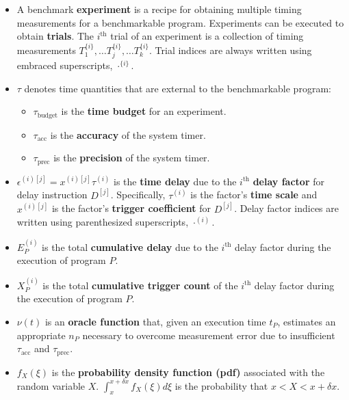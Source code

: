 \documentclass[conference]{IEEEtran}
\begin{document}
\begin{itemize}
    \item
    A benchmark \textbf{experiment} is a recipe for obtaining multiple timing measurements
    for a benchmarkable program. Experiments can be executed to obtain \textbf{trials}. The
    $i^{\textrm{th}}$ trial of an experiment is a collection of timing measurements
    $T^{\{i\}}_1, \dots T^{\{i\}}_j, \dots T^{\{i\}}_k$. Trial indices are always
    written using embraced superscripts, $\cdot^{\{i\}}$.

    \item
    $\tau$ denotes time quantities that are external to the benchmarkable program:
    \begin{itemize}
        \item $\tau_{\textrm{budget}}$ is the \textbf{time budget} for an experiment.
        \item $\tau_{\textrm{acc}}$ is the \textbf{accuracy} of the system timer.
        \item $\tau_{\textrm{prec}}$ is the \textbf{precision} of the system timer.
    \end{itemize}

    \item
    $\epsilon^{(i)[j]} = x^{(i)[j]} \tau^{(i)}$ is the \textbf{time delay} due to the
    $i^{\textrm{th}}$ \textbf{delay factor} for delay instruction $D^{[j]}$.  Specifically,
    $\tau^{(i)}$ is the factor's \textbf{time scale} and $x^{(i)[j]}$ is the factor's
    \textbf{trigger coefficient} for $D^{[j]}$. Delay factor indices are written using
    parenthesized superscripts, $\cdot^{(i)}$.

    \item
    $E_P^{(i)}$ is the total \textbf{cumulative delay} due to the $i^{\textrm{th}}$ delay
    factor during the execution of program $P$.

    \item
    $X^{(i)}_P$ is the total \textbf{cumulative trigger count} of the $i^{\textrm{th}}$
    delay factor during the execution of program $P$.

    \item
    $\nu(t)$ is an \textbf{oracle function} that, given an execution time $t_P$, estimates
    an appropriate $n_P$ necessary to overcome measurement error due to insufficient
    $\tau_{\textrm{acc}}$ and $\tau_{\textrm{prec}}$.

    \item
    $f_X(\xi)$ is the \textbf{probability density function (pdf)} associated with the random
    variable $X$. $\int_{x}^{x+\delta x} f_X(\xi) d\xi$ is the probability that $x < X <
    x+\delta x$.
\end{itemize}
\end{document}
